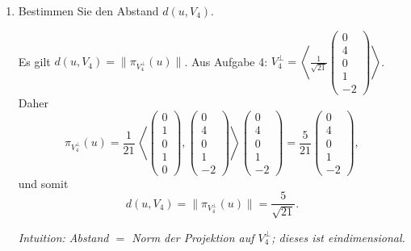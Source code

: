 \documentclass[11pt, a4paper]{article}
\begin{document}
\begin{enumerate}
  \item Bestimmen Sie den Abstand $d(u,V_4)$.
  \begin{framed}
  Es gilt $d(u,V_4)=\|\pi_{V_4^\perp}(u)\|$. Aus Aufgabe 4: 
  $V_4^\perp=\left\langle \frac{1}{\sqrt{21}}\begin{pmatrix}0\\4\\0\\1\\-2\end{pmatrix}\right\rangle$.
  Daher
  \[
  \pi_{V_4^\perp}(u)=\frac{1}{21}\,\left\langle \begin{pmatrix}0\\1\\0\\1\\0\end{pmatrix},
  \begin{pmatrix}0\\4\\0\\1\\-2\end{pmatrix}\right\rangle
  \begin{pmatrix}0\\4\\0\\1\\-2\end{pmatrix}
  =\frac{5}{21}\begin{pmatrix}0\\4\\0\\1\\-2\end{pmatrix},
  \]
  und somit
  \[
  d(u,V_4)=\bigl\|\pi_{V_4^\perp}(u)\bigr\|=\frac{5}{\sqrt{21}}.
  \]

  \medskip\noindent\textit{Intuition: Abstand $=$ Norm der Projektion auf $V_4^\perp$; dieses ist eindimensional.}
  \end{framed}


\end{enumerate}
\end{document}
